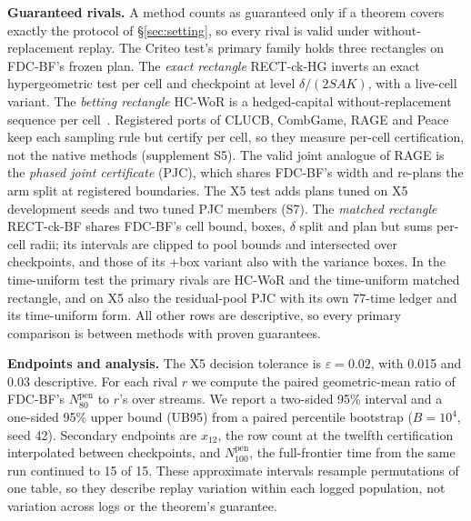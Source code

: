 \documentclass[sigconf,anonymous,review]{acmart}
\newcommand{\eps}{\varepsilon}
\newcommand{\Npen}{N_{80}^{\text{pen}}}
\begin{document}
\textbf{Guaranteed rivals.} A method counts as guaranteed only if a theorem covers exactly the protocol of \S\ref{sec:setting}, so every rival is valid under without-replacement replay. The Criteo test's primary family holds three rectangles on FDC-BF's frozen plan. The \emph{exact rectangle} RECT-ck-HG inverts an exact hypergeometric test per cell and checkpoint at level $\delta/(2SAK)$, with a live-cell variant. The \emph{betting rectangle} HC-WoR is a hedged-capital without-replacement sequence per cell~\citep{waudbysmith2020confidence,waudbysmith2024estimating}. Registered ports of CLUCB, CombGame, RAGE and Peace keep each sampling rule but certify per cell, so they measure per-cell certification, not the native methods (supplement S5). The valid joint analogue of RAGE is the \emph{phased joint certificate} (PJC), which shares FDC-BF's width and re-plans the arm split at registered boundaries. The X5 test adds plans tuned on X5 development seeds and two tuned PJC members (S7). The \emph{matched rectangle} RECT-ck-BF shares FDC-BF's cell bound, boxes, $\delta$ split and plan but sums per-cell radii; its intervals are clipped to pool bounds and intersected over checkpoints, and those of its +box variant also with the variance boxes. In the time-uniform test the primary rivals are HC-WoR and the time-uniform matched rectangle, and on X5 also the residual-pool PJC with its own 77-time ledger and its time-uniform form. All other rows are descriptive, so every primary comparison is between methods with proven guarantees.

\textbf{Endpoints and analysis.} The X5 decision tolerance is $\eps = 0.02$, with 0.015 and 0.03 descriptive. For each rival $r$ we compute the paired geometric-mean ratio of FDC-BF's $\Npen$ to $r$'s over streams. We report a two-sided 95\% interval and a one-sided 95\% upper bound (UB95) from a paired percentile bootstrap ($B = 10^4$, seed 42). Secondary endpoints are $x_{12}$, the row count at the twelfth certification interpolated between checkpoints, and $N_{100}^{\text{pen}}$, the full-frontier time from the same run continued to 15 of 15. These approximate intervals resample permutations of one table, so they describe replay variation within each logged population, not variation across logs or the theorem's guarantee.
\end{document}
